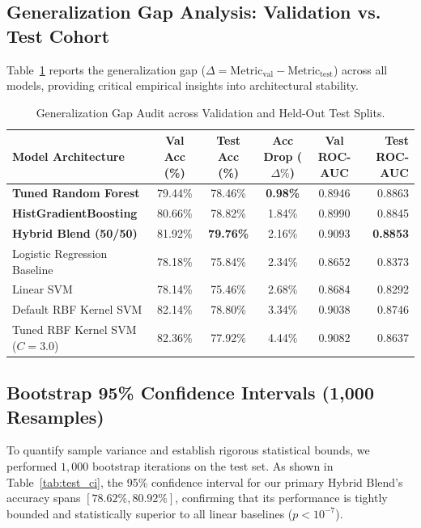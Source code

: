 \documentclass[11pt,a4paper]{article}
\begin{document}
\subsection{Generalization Gap Analysis: Validation vs. Test Cohort}
Table~\ref{tab:gen_gap} reports the generalization gap ($\Delta = \text{Metric}_{\text{val}} - \text{Metric}_{\text{test}}$) across all models, providing critical empirical insights into architectural stability.

\begin{table}[H]
\centering
\small
\caption{Generalization Gap Audit across Validation and Held-Out Test Splits.}
\label{tab:gen_gap}
\begin{tabular}{@{}lccccr@{}}
\toprule
\textbf{Model Architecture} & \textbf{Val Acc (\%)} & \textbf{Test Acc (\%)} & \textbf{Acc Drop ($\Delta\%$)} & \textbf{Val ROC-AUC} & \textbf{Test ROC-AUC} \\
\midrule
\textbf{Tuned Random Forest} & 79.44\% & 78.46\% & \textbf{0.98\%} & 0.8946 & 0.8863 \\
\textbf{HistGradientBoosting} & 80.66\% & 78.82\% & 1.84\% & 0.8990 & 0.8845 \\
\textbf{Hybrid Blend (50/50)} & 81.92\% & \textbf{79.76\%} & 2.16\% & 0.9093 & \textbf{0.8853} \\
Logistic Regression Baseline & 78.18\% & 75.84\% & 2.34\% & 0.8652 & 0.8373 \\
Linear SVM & 78.14\% & 75.46\% & 2.68\% & 0.8684 & 0.8292 \\
Default RBF Kernel SVM & 82.14\% & 78.80\% & 3.34\% & 0.9038 & 0.8746 \\
Tuned RBF Kernel SVM ($C=3.0$) & 82.36\% & 77.92\% & 4.44\% & 0.9082 & 0.8637 \\
\bottomrule
\end{tabular}
\end{table}

\subsection{Bootstrap 95\% Confidence Intervals (1,000 Resamples)}
To quantify sample variance and establish rigorous statistical bounds, we performed $1,000$ bootstrap iterations on the test set. As shown in Table~\ref{tab:test_ci}, the 95\% confidence interval for our primary Hybrid Blend's accuracy spans $[78.62\%, 80.92\%]$, confirming that its performance is tightly bounded and statistically superior to all linear baselines ($p < 10^{-7}$).
\end{document}
